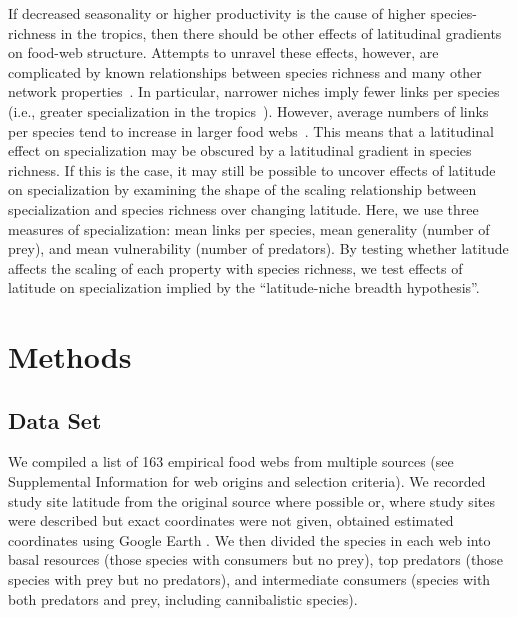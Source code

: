 \documentclass[12pt]{article}
\begin{document}
  If decreased seasonality or higher productivity is the cause of higher species-richness in the tropics, then 
  there should be other effects of latitudinal gradients on food-web structure. Attempts to unravel these effects, however,
  are complicated by known relationships between species richness and many other network properties~\citep{Riede2010}. In particular,
  narrower niches imply fewer links per species (i.e., greater specialization in the tropics~\citep{}). However,
  average numbers of links per species tend to increase in larger food webs~\citep{Dunne2006,Riede2010}. This means
  that a latitudinal effect on specialization may be obscured by a latitudinal gradient in species richness. If this is
  the case, it may still be possible to uncover effects of latitude on specialization by examining the shape of the scaling 
  relationship between specialization and species richness over changing latitude. Here, we use three measures of specialization:
  mean links per species, mean generality (number of prey), and mean vulnerability (number of predators). By testing whether
  latitude affects the scaling of each property with species richness, we test effects of latitude on specialization implied by
  the ``latitude-niche breadth hypothesis''.



\section*{Methods}

\subsection*{Data Set} 

  We compiled a list of 163 empirical food webs from
  multiple sources (see Supplemental Information for web origins and selection
  criteria). We recorded study site latitude from the original source where
  possible or, where study sites were described but exact coordinates were not
  given, obtained estimated coordinates using Google Earth \citep{GoogleEarth}.
  We then divided the species in each web into basal resources (those species with
  consumers but no prey), top predators (those species with prey but no predators),
  and intermediate consumers (species with both predators and prey, including cannibalistic
  species). 
\end{document}
